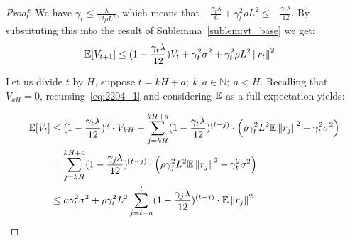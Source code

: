 \begin{proof}
    We have $ \gamma_{t} \leq \frac{\lambda}{12\rho L^2} $, which means that $-\frac{\gamma_{t} \lambda }{6} + \gamma_{t}^2 \rho L^2 \leq -\frac{\gamma_{t} \lambda}{12}$. By substituting this into the result of Sublemma~\ref{sublem:vt_base} we get:
    \begin{align}
        \E [V_{t+1}]
        &\leq
        (1 - \frac {\gamma_{t} \lambda}{12}) V_t
        + \gamma_{t}^2 \sigma^2 + \gamma_{t}^2 \rho L^2 \norm{r_t}^2
        \label{eq:2204_1}
    \end{align}
    

    Let us divide $t$ by $H$, suppose $t = kH + a; \ k, a \in \mathbb{N}; \ a < H$.
    Recalling that $V_{kH} = 0$, recursing~\eqref{eq:2204_1} and considering $\E$ as a full expectation yields:
    
    \begin{align}
        \E [V_{t}]
        &\leq
        (1 - \frac{\gamma_{t} \lambda}{12})^a  \cdot V_{kH} 
        +
        \summ{j=kH}{kH+a}
        (1 - \frac{\gamma_{t} \lambda} {12})^{(t-j)}
        \cdot
        \left(
        \rho \gamma_{t}^2 L^2 \E \norm{r_j}^2 + \gamma_{t}^2 \sigma^2
        \right) \\
        &=
        \summ{j=kH}{kH+a}
        (1 - \frac{\gamma_{j} \lambda} {12})^{(t-j)}
        \cdot 
        \left(
        \rho \gamma_{j}^2 L^2 \E \norm{r_j}^2 + \gamma_{t}^2 \sigma^2
        \right) \\
        &\leq
        a \gamma_{t}^2 \sigma^2 +
        \rho \gamma_{t}^2 L^2 \summ{j=t-a}{t}
        (1 - \frac{\gamma_{j} \lambda} {12})^{(t-j)}
        \cdot \E \norm{r_j}^2 
    \end{align}
\end{proof}
